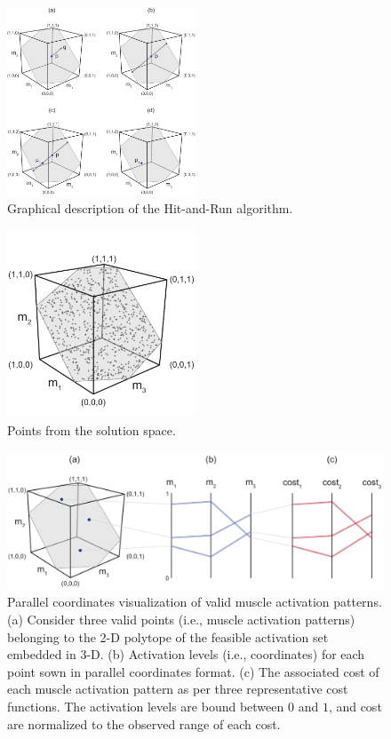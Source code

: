 \documentclass[10pt,letterpaper]{article}
\begin{document}
\begin{figure}[htbp]
\centering
\includegraphics[width=0.5\textwidth]{numbered_figures/figure_2_hit_and_run_steps.pdf}
\caption{Graphical description of the Hit-and-Run algorithm.}
\label{fig:figure_2_hit_and_run_steps}
\end{figure}

\begin{figure}[htbp]
\centering
\includegraphics[width=0.5\textwidth]{numbered_figures/figure_3_hit_and_run_result.pdf}
\caption{Points from the solution space.}
\label{fig:figure_3_hit_and_run_result.pdf}
\end{figure}

\begin{figure}[htbp]
  \centering
  \includegraphics[width=1.0\textwidth]{numbered_figures/figure_4_parcoord_schematic.pdf}
  \caption{Parallel coordinates visualization of valid muscle activation patterns. (a) Consider three valid points (i.e., muscle activation patterns) belonging to the 2-D polytope of the feasible activation set embedded in 3-D.  (b) Activation levels (i.e., coordinates) for each point sown in parallel coordinates format. (c) The associated cost of each muscle activation pattern as per three representative cost functions.
The activation levels are bound between $0$ and $1$, and cost are normalized to the observed range of each cost.}
  \label{fig:points_to_parcoords_mapping}
\end{figure}
\end{document}
